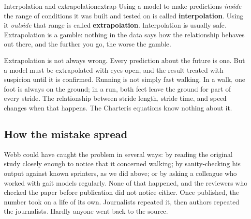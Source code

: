 \documentclass[11pt,twoside,openany]{book}
\newcounter{check}[chapter]
\begin{document}
\begin{definition}{Interpolation and extrapolation}{extrap}
Using a model to make predictions \emph{inside} the range of conditions it was built and tested on is called \textbf{interpolation}. Using it \emph{outside} that range is called \textbf{extrapolation}. Interpolation is usually safe. Extrapolation is a gamble: nothing in the data says how the relationship behaves out there, and the further you go, the worse the gamble.
\end{definition}

Extrapolation is not always wrong. Every prediction about the future is one. But a model must be extrapolated with eyes open, and the result treated with suspicion until it is confirmed. Running is not simply fast walking. In a walk, one foot is always on the ground; in a run, both feet leave the ground for part of every stride. The relationship between stride length, stride time, and speed changes when that happens. The Charteris equations know nothing about it.

\subsection{How the mistake spread}

Webb could have caught the problem in several ways: by reading the original study closely enough to notice that it concerned walking; by sanity-checking his output against known sprinters, as we did above; or by asking a colleague who worked with gait models regularly. None of that happened, and the reviewers who checked the paper before publication did not notice either. Once published, the number took on a life of its own. Journalists repeated it, then authors repeated the journalists. Hardly anyone went back to the source.
\end{document}

